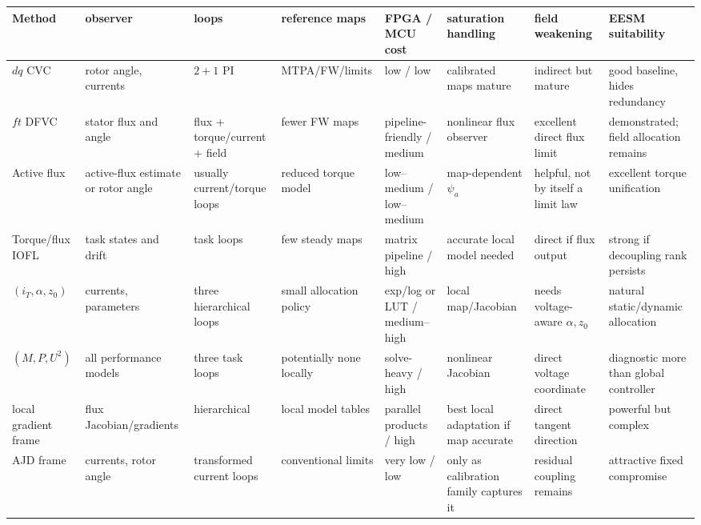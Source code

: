 \begin{landscape}
\begin{center}
\label{tab:coordinate-comparison-implementation}
\scriptsize
\begin{tabularx}{\linewidth}{lXXXXXXX}
\toprule
Method & observer & loops & reference maps & FPGA / MCU cost & saturation
handling & field weakening & EESM suitability\\
\midrule
\(dq\) CVC & rotor angle, currents & \(2+1\) PI & MTPA/FW/limits & low / low &
calibrated maps mature & indirect but mature & good baseline, hides redundancy\\
\(ft\) DFVC & stator flux and angle & flux + torque/current + field & fewer FW maps &
pipeline-friendly / medium & nonlinear flux observer & excellent direct flux limit & demonstrated; field allocation remains\\
Active flux & active-flux estimate or rotor angle & usually current/torque loops & reduced torque model &
low--medium / low--medium & map-dependent \(\psi_a\) & helpful, not by itself a limit law & excellent torque unification\\
Torque/flux IOFL & task states and drift & task loops & few steady maps &
matrix pipeline / high & accurate local model needed & direct if flux output & strong if decoupling rank persists\\
\((i_T,\alpha,z_0)\) & currents, parameters & three hierarchical loops & small allocation policy &
exp/log or LUT / medium--high & local map/Jacobian & needs voltage-aware \(\alpha,z_0\) & natural static/dynamic allocation\\
\((M,P,U^2)\) & all performance models & three task loops & potentially none locally &
solve-heavy / high & nonlinear Jacobian & direct voltage coordinate & diagnostic more than global controller\\
local gradient frame & flux Jacobian/gradients & hierarchical & local model tables &
parallel products / high & best local adaptation if map accurate & direct tangent direction & powerful but complex\\
AJD frame & currents, rotor angle & transformed current loops & conventional limits &
very low / low & only as calibration family captures it & residual coupling remains & attractive fixed compromise\\
\bottomrule
\end{tabularx}
\end{center}
\end{landscape}

